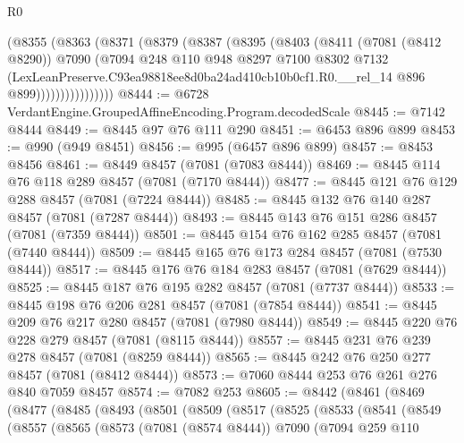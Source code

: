 \begin{lexlean}{R0}
\begin{coremodule}
                (@8355
                  (@8363
                    (@8371
                      (@8379
                        (@8387
                          (@8395
                            (@8403
                              (@8411
                                (@7081 (@8412 @8290))
                                @7090
                                (@7094
                                  @248
                                  @110
                                  @948
                                  @8297
                                  @7100
                                  @8302
                                  @7132
                                  (LexLeanPreserve.C93ea98818ee8d0ba24ad410cb10b0cf1.R0.__rel_14
                                    @896
                                    @899))))))))))))))))
@8444 := @6728 VerdantEngine.GroupedAffineEncoding.Program.decodedScale
@8445 := @7142 @8444
@8449 := @8445 @97 @76 @111 @290
@8451 := @6453 @896 @899
@8453 := @990 (@949 @8451)
@8456 := @995 (@6457 @896 @899)
@8457 := @8453 @8456
@8461 := @8449 @8457 (@7081 (@7083 @8444))
@8469 := @8445 @114 @76 @118 @289 @8457 (@7081 (@7170 @8444))
@8477 := @8445 @121 @76 @129 @288 @8457 (@7081 (@7224 @8444))
@8485 := @8445 @132 @76 @140 @287 @8457 (@7081 (@7287 @8444))
@8493 := @8445 @143 @76 @151 @286 @8457 (@7081 (@7359 @8444))
@8501 := @8445 @154 @76 @162 @285 @8457 (@7081 (@7440 @8444))
@8509 := @8445 @165 @76 @173 @284 @8457 (@7081 (@7530 @8444))
@8517 := @8445 @176 @76 @184 @283 @8457 (@7081 (@7629 @8444))
@8525 := @8445 @187 @76 @195 @282 @8457 (@7081 (@7737 @8444))
@8533 := @8445 @198 @76 @206 @281 @8457 (@7081 (@7854 @8444))
@8541 := @8445 @209 @76 @217 @280 @8457 (@7081 (@7980 @8444))
@8549 := @8445 @220 @76 @228 @279 @8457 (@7081 (@8115 @8444))
@8557 := @8445 @231 @76 @239 @278 @8457 (@7081 (@8259 @8444))
@8565 := @8445 @242 @76 @250 @277 @8457 (@7081 (@8412 @8444))
@8573 := @7060 @8444 @253 @76 @261 @276 @840 @7059 @8457
@8574 := @7082 @253
@8605 := @8442
    (@8461
      (@8469
        (@8477
          (@8485
            (@8493
              (@8501
                (@8509
                  (@8517
                    (@8525
                      (@8533
                        (@8541
                          (@8549
                            (@8557
                              (@8565
                                (@8573
                                  (@7081 (@8574 @8444))
                                  @7090
                                  (@7094
                                    @259
                                    @110

\end{coremodule}
\end{lexlean}
